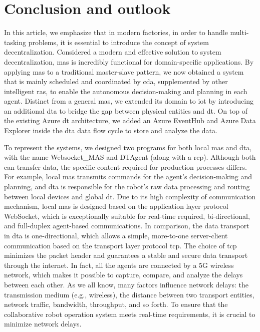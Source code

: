 \chapter{Conclusion and outlook}

In this article, we emphasize that in modern factories, in order to handle 
multi-tasking problems, it is essential to introduce the concept of system 
decentralization. Considered a modern and effective solution to system 
decentralization, \gls{mas} is incredibly functional for domain-specific 
applications. By applying \gls{mas} to a traditional master-slave\cite{egger_deployment-friendly_2020} 
pattern, we now obtained a system that is mainly scheduled and coordinated 
by \gls{cda}, supplemented by other intelligent \gls{ras}, to enable the 
autonomous decision-making and planning in each agent. Distinct from a 
general \gls{mas}, we extended its domain to \gls{iot} by 
introducing an additional \gls{dta} to bridge the gap between physical 
entities and \gls{dt}. On top of the existing Azure \gls{dt} architecture, we 
added an Azure EventHub and Azure Data Explorer inside the \gls{dta} data 
flow cycle to store and analyze the data. 


To represent the systems, we designed two programs for both local 
\gls{mas} and \gls{dta}, with the name Websocket\_MAS and DTAgent 
(along with a \gls{rcp}). Although both can transfer data, the 
specific content required for production processes differs. For 
example, local \gls{mas} transmits commands for the agent's decision-making 
and planning, and \gls{dta} is responsible for the robot's raw data processing 
and routing between local devices and global \gls{dt}. Due to its high complexity 
of communication mechanism, local \gls{mas} is designed based on the application 
layer protocol WebSocket, which is exceptionally suitable for real-time required, 
bi-directional, and full-duplex agent-based communications. 
In comparison, the data transport in \gls{dta} is one-directional, which allows 
a simple, more-to-one server-client communication based on the transport layer 
protocol \gls{tcp}. The choice of \gls{tcp} minimizes the packet header and 
guarantees a stable and secure data transport through the internet. In fact, 
all the agents are connected by a 5G wireless network, which makes it possible 
to capture, compare, and analyze the delays between each other. As we all know, 
many factors influence network delays: the transmission medium (e.g., wireless), 
the distance between two transport entities, network traffic, bandwidth, 
throughput, and so forth. To ensure that the collaborative robot operation 
system meets real-time requirements, it is crucial to minimize network delays. 



